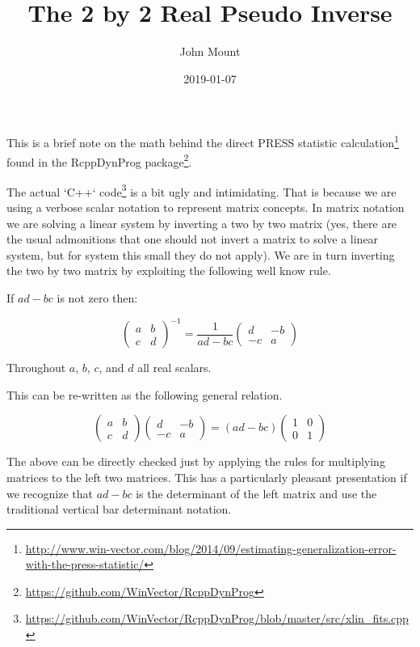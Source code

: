 \documentclass{article}
\begin{document}
\title{The 2 by 2 Real Pseudo Inverse}
\author{John Mount}
\date{2019-01-07}




\maketitle


This is a brief note on the math behind the direct
PRESS statistic calculation\footnote{\url{http://www.win-vector.com/blog/2014/09/estimating-generalization-error-with-the-press-statistic/}} 
found in the RcppDynProg package\footnote{\url{https://github.com/WinVector/RcppDynProg}}.

The actual `C++` code\footnote{\url{https://github.com/WinVector/RcppDynProg/blob/master/src/xlin_fits.cpp}} is a bit ugly and intimidating.  That is because we are using a verbose scalar notation to represent matrix concepts.  In matrix notation we are solving a linear system by inverting a two by two matrix (yes, there are the usual admonitions that one should not invert a matrix to solve a linear system, but for system this small they do not apply).  We are in turn inverting the two by two matrix by exploiting the following well know rule.


If $a d - b c$ is not zero then:

\[ 
\begin{pmatrix} a & b \\ c & d \end{pmatrix}^{-1}
=
\frac{1}{a d - b c}
\begin{pmatrix} d & -b \\ -c & a \end{pmatrix}
\]

Throughout $a$, $b$, $c$, and $d$ all real scalars.

This can be re-written as the following general relation.

\[ 
\begin{pmatrix} a & b \\ c & d \end{pmatrix}
\begin{pmatrix} d & -b \\ -c & a \end{pmatrix}
=
(a d - b c) 
\begin{pmatrix} 1 & 0 \\ 0 & 1 \end{pmatrix}
\]

The above can be directly checked just by applying the rules for multiplying matrices to the left two matrices.  This has a particularly pleasant presentation if we recognize that $a d - b c$ is  the determinant of the left matrix and use the traditional vertical bar determinant notation.
\end{document}
